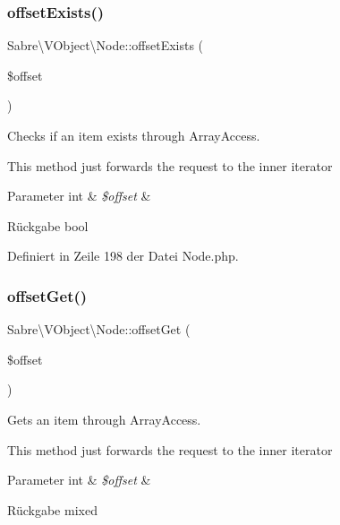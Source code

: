 \subsubsection{\texorpdfstring{offset\+Exists()}{offsetExists()}}
{\footnotesize\ttfamily Sabre\textbackslash{}\+V\+Object\textbackslash{}\+Node\+::offset\+Exists (\begin{DoxyParamCaption}\item[{}]{\$offset }\end{DoxyParamCaption})}

Checks if an item exists through Array\+Access.

This method just forwards the request to the inner iterator


\begin{DoxyParams}[1]{Parameter}
int & {\em \$offset} & \\
\hline
\end{DoxyParams}
\begin{DoxyReturn}{Rückgabe}
bool 
\end{DoxyReturn}


Definiert in Zeile 198 der Datei Node.\+php.

\mbox{\label{class_sabre_1_1_v_object_1_1_node_aef9b671ed3550954fa5db043fca78c8b}} 
\subsubsection{\texorpdfstring{offset\+Get()}{offsetGet()}}
{\footnotesize\ttfamily Sabre\textbackslash{}\+V\+Object\textbackslash{}\+Node\+::offset\+Get (\begin{DoxyParamCaption}\item[{}]{\$offset }\end{DoxyParamCaption})}

Gets an item through Array\+Access.

This method just forwards the request to the inner iterator


\begin{DoxyParams}[1]{Parameter}
int & {\em \$offset} & \\
\hline
\end{DoxyParams}
\begin{DoxyReturn}{Rückgabe}
mixed 
\end{DoxyReturn}


